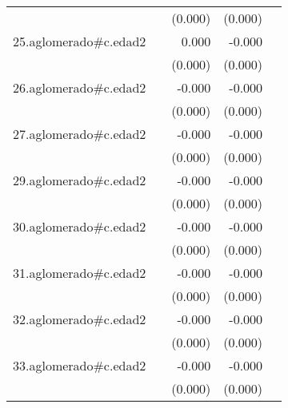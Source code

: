 {\begin{longtable}{l*{4}{D{.}{.}{-1}}}
            &                     &     (0.000)         &     (0.000)         &                     \\
\addlinespace
25.aglomerado#c.edad2&                     &       0.000         &      -0.000         &                     \\
            &                     &     (0.000)         &     (0.000)         &                     \\
\addlinespace
26.aglomerado#c.edad2&                     &      -0.000         &      -0.000         &                     \\
            &                     &     (0.000)         &     (0.000)         &                     \\
\addlinespace
27.aglomerado#c.edad2&                     &      -0.000         &      -0.000         &                     \\
            &                     &     (0.000)         &     (0.000)         &                     \\
\addlinespace
29.aglomerado#c.edad2&                     &      -0.000         &      -0.000         &                     \\
            &                     &     (0.000)         &     (0.000)         &                     \\
\addlinespace
30.aglomerado#c.edad2&                     &      -0.000         &      -0.000\sym{*}  &                     \\
            &                     &     (0.000)         &     (0.000)         &                     \\
\addlinespace
31.aglomerado#c.edad2&                     &      -0.000         &      -0.000         &                     \\
            &                     &     (0.000)         &     (0.000)         &                     \\
\addlinespace
32.aglomerado#c.edad2&                     &      -0.000         &      -0.000\sym{**} &                     \\
            &                     &     (0.000)         &     (0.000)         &                     \\
\addlinespace
33.aglomerado#c.edad2&                     &      -0.000         &      -0.000\sym{*}  &                     \\
            &                     &     (0.000)         &     (0.000)         &                     \\

\end{longtable}}
